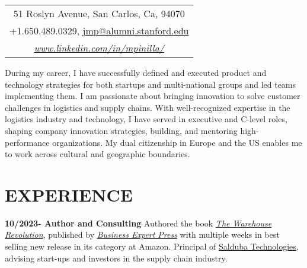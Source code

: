 \documentclass{res}
\begin{document}
\thispagestyle{empty} %


\begin{resume}

\begin{table}[h]
\centering
\begin{tabular}{c}
51 Roslyn Avenue, San Carlos, Ca, 94070\\
+1.650.489.0329, \href{mailto://jmp@alumni.stanford.edu}{jmp@alumni.stanford.edu}\\
\href{https://www.linkedin.com/in/mpinilla/}{\it www.linkedin.com/in/mpinilla/}
\end{tabular}
\end{table}
\vspace{0.1in}

    During my career, I have successfully defined and executed product and technology strategies for both startups and multi-national groups and led teams implementing them. I am passionate about bringing innovation to solve customer challenges in logistics and supply chains. With well-recognized expertise in the logistics industry and technology, I have served in executive and C-level roles, shaping company innovation strategies, building, and mentoring high-performance organizations. My dual citizenship in Europe and the US enables me to work across cultural and geographic boundaries.

\begin{comment}
\begin{itemize}
\item 
\item My passion for solving the supply chain challenges of large Deep technical expertise that allows me to lead highly capable teams.
\item A passion to develop the engineering teams that build and deliver software products.
\item Hands on experience on a variety of Software Development methodologies, with multiple years of agile practice with Scrum based teams.
\end{itemize}
\end{comment}

\section{EXPERIENCE}
{\bf 10/2023- Author and Consulting} Authored the book \href{https://amzn.to/4d4CFqn}{\em The Warehouse Revolution}, published by \href{https://www.businessexpertpress.com/}{\em Business Expert Press} with multiple weeks in best selling new release in its category at Amazon. Principal of \href{https://www.salduba.info/}{Salduba Technologies}, advising start-ups and investors in the supply chain industry.


\end{resume}
\end{document}
